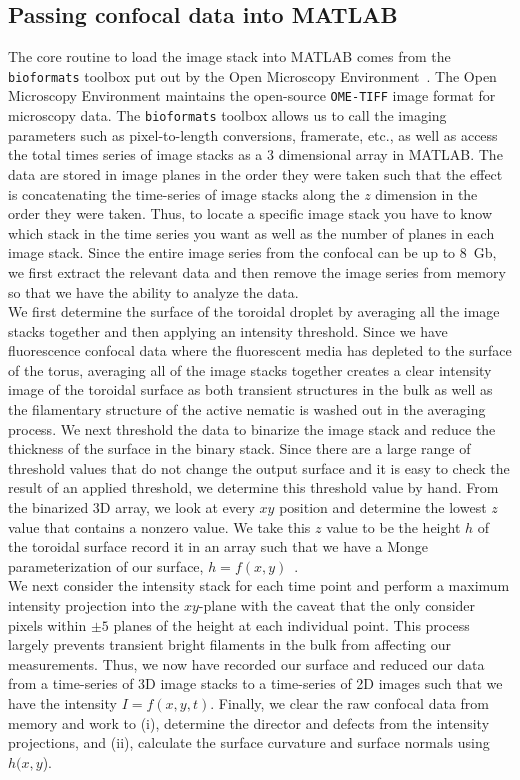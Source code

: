 \subsection{Passing confocal data into MATLAB}
The core routine to load the image stack into MATLAB comes from the \texttt{bioformats} toolbox put out by the Open Microscopy Environment~\cite{RN265}.
The Open Microscopy Environment maintains the open-source \texttt{OME-TIFF} image format for microscopy data.
The \texttt{bioformats} toolbox allows us to call the imaging parameters such as pixel-to-length conversions, framerate, etc., as well as access the total times series of image stacks as a 3 dimensional array in MATLAB.
The data are stored in image planes in the order they were taken such that the effect is concatenating the time-series of image stacks along the $z$ dimension in the order they were taken.
Thus, to locate a specific image stack you have to know which stack in the time series you want as well as the number of planes in each image stack.
Since the entire image series from the confocal can be up to 8~Gb, we first extract the relevant data and then remove the image series from memory so that we have the ability to analyze the data.\\

We first determine the surface of the toroidal droplet by averaging all the image stacks together and then applying an intensity threshold.
Since we have fluorescence confocal data where the fluorescent media has depleted to the surface of the torus, averaging all of the image stacks together creates a clear intensity image of the toroidal surface as both transient structures in the bulk as well as the filamentary structure of the active nematic is washed out in the averaging process.
We next threshold the data to binarize the image stack and reduce the thickness of the surface in the binary stack.
Since there are a large range of threshold values that do not change the output surface and it is easy to check the result of an applied threshold, we determine this threshold value by hand.
From the binarized 3D array, we look at every $xy$ position and determine the lowest $z$ value that contains a nonzero value.
We take this $z$ value to be the height $h$ of the toroidal surface record it in an array such that we have a Monge parameterization of our surface, $h = f(x,y)$~\cite{RN23}. \\

We next consider the intensity stack for each time point and perform a maximum intensity projection into the $xy$-plane with the caveat that the only consider pixels within $\pm 5$ planes of the height at each individual point.
This process largely prevents transient bright filaments in the bulk from affecting our measurements.
Thus, we now have recorded our surface and reduced our data from a time-series of 3D image stacks to a time-series of 2D images such that we have the intensity $I = f(x,y,t)$.
Finally, we clear the raw confocal data from memory and work to (i), determine the director and defects from the intensity projections, and (ii), calculate the surface curvature and surface normals using $h(x,y$).




